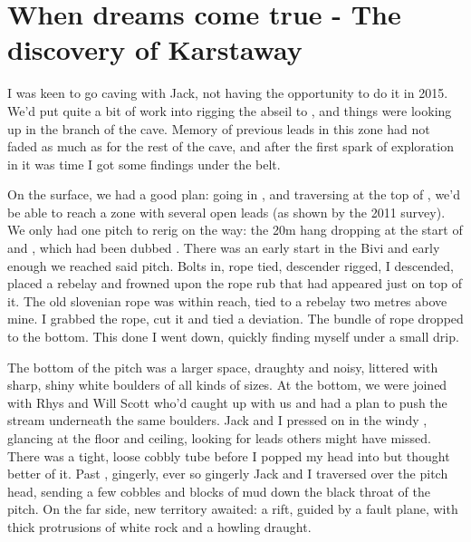 \section{When dreams come true - The discovery of Karstaway} 


I was keen to go caving with Jack, not having the opportunity to do it in 2015. We'd put quite a bit of work into rigging the abseil to , and things were looking up in the  branch of the cave. Memory of previous leads in this zone had not faded as much as for the rest of the cave, and after the first spark of exploration in  it was time I got some findings under the belt.

On the surface, we had a good plan: going in , and traversing at the top of , we'd be able to reach a zone with several open leads (as shown by the 2011 survey). We only had one pitch to rerig on the way: the 20m hang dropping at the start of  and , which had been dubbed . There was an early start in the Bivi and early enough we reached said pitch. Bolts in, rope tied, descender rigged, I descended, placed a rebelay and frowned upon the rope rub that had appeared just on top of it. The old slovenian rope was within reach, tied to a rebelay two metres above mine. I grabbed the rope, cut it and tied a deviation. The bundle of rope dropped to the bottom. This done I went down, quickly finding myself under a small drip. 

The bottom of the pitch was a larger space, draughty and noisy, littered with sharp, shiny white boulders of all kinds of sizes. At the bottom, we were joined with Rhys and Will Scott who'd caught up with us and had a plan to push the stream underneath the same boulders. Jack and I pressed on in the windy , glancing at the floor and ceiling, looking for leads others might have missed. There was a tight, loose cobbly tube before  I popped my head into but thought better of it. Past , gingerly, ever so gingerly Jack and I traversed over the pitch head, sending a few cobbles and blocks of mud down the black throat of the pitch. On the far side, new territory awaited: a rift, guided by a fault plane, with thick protrusions of white rock and a howling draught.

